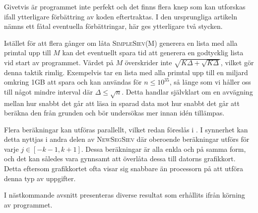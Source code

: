 Givetvis är programmet inte perfekt och det finns flera knep som kan utforskas ifall ytterligare förbättring av koden eftertraktas.
I den ursprungliga artikeln \cite{HaraldSieve} nämns ett fåtal eventuella förbättringar, här ges ytterligare två stycken.
\begin{myitemize}
    \item
    Istället för att flera gånger om låta \textsc{SimpleSiev(M)} generera en lista med alla primtal upp till $M$ kan det eventuellt spara tid att generera en godtycklig lista vid start av programmet.
    Värdet på $M$ överskrider inte $\sqrt{K\Delta+\sqrt{K\Delta}}$, vilket gör denna taktik rimlig.
    Exempelvis tar en lista med alla primtal upp till en miljard omkring 1GB att spara och kan användas för $n\leq 10^{35}$, så länge som vi håller oss till något mindre interval där $\Delta\leq\sqrt{n}$.
    Detta handlar självklart om en avvägning mellan hur snabbt det går att läsa in sparad data mot hur snabbt det går att beräkna den från grunden och bör undersökas mer innan idén tillämpas.
    \item
    Flera beräkningar kan utföras parallellt, vilket redan föreslås i \cite{HaraldSieve}. 
    I synnerhet kan detta nyttjas i andra delen av \textsc{NewSegSiev} där oberoende beräkningar utförs för varje $j\in[-k-1,k+1]$.
    Dessa beräkningar är alla enkla och på samma form, och det kan således vara gynnsamt att överlåta dessa till datorns grafikkort.
    Detta eftersom grafikkortet ofta visar sig snabbare än processorn på att utföra denna typ av uppgifter.
\end{myitemize}

I nästkommande avsnitt presenteras diverse resultat som erhållits ifrån körning av programmet.

\begin{comment}
    \item
    Deklaration av temporära variabler har i vissa fall kunnat uteslutas genom sammanskrivning av flera uttryck. 
    Ett specialfall av detta nyttjas i \textsc{DiophAppr} där vi har ersatt uttryck på formen \texttt{temp=x; x=y; y=temp;} med det snabbare \texttt{x,y=y,x;}.

    \item Flera while-loopar har kunnat ersättas med for-loopar,
    som ger att istället för att testa ett argument för varje iteration i loopen,
    behöver argumentet bara testas en gång när loopen påbörjas.
    \item Infogande av iteratorer vid iterering över primtalslistor, vilket också resulterar i bättre nyttjande av cache.

    \item
    I \textsc{DiophAppr} beräknas både heltals- och decimaldelen av $\alpha$. Detta görs i nuläget separat men skulle kunna göras samtidigt.
    Förslagsvis skulle då if-satsen ändras till att testa ifall decimaldelen är noll.
\end{comment}
